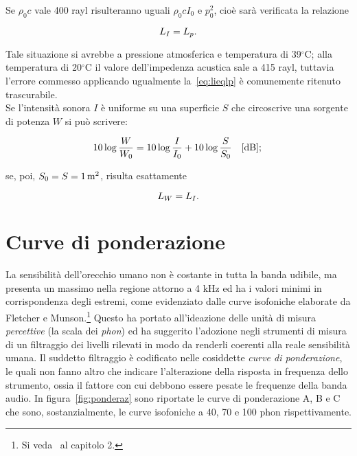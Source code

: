 Se $\rho_0 c$ vale 400 rayl risulteranno uguali $\rho_0 c I_0$ e $p_0^2$, cio\`e sar\`a verificata la
relazione 

\begin{equation}
  \label{eq:lieqlp}
  L_I = L_p.\\
\end{equation}

Tale situazione si avrebbe a pressione atmosferica e temperatura di 39$^\circ$C; alla temperatura di
20$^\circ$C il valore dell'impedenza acustica sale a 415 rayl, tuttavia l'errore commesso applicando
ugualmente la~\ref{eq:lieqlp} \`e comunemente ritenuto trascurabile.\\
Se l'intensit\`a sonora $I$ \`e uniforme su una superficie $S$ che circoscrive una sorgente di potenza
$W$ si pu\`o scrivere:

\begin{equation}
  \label{eq:lweqlieqls}
  10 \log \frac{W}{W_0} = 10 \log \frac{I}{I_0} + 10 \log \frac{S}{S_0} \quad \textrm{[dB]};\\
\end{equation}

se, poi, $S_0 = S = 1 \, \textrm{m}^2$, risulta esattamente 

\begin{equation}
  \label{eq:lweqli}
  L_W = L_I.\\
\end{equation}


\section{Curve di ponderazione}
\label{sec:pondcurves}

La sensibilit\`a dell'orecchio umano non \`e costante in tutta la banda udibile, ma presenta un massimo
nella regione attorno a 4 kHz ed ha i valori minimi in corrispondenza degli estremi, come evidenziato
dalle curve isofoniche elaborate da Fletcher e Munson.\footnote{ Si veda~\cite{mdaa} al capitolo 2.}
Questo ha portato all'ideazione delle unit\`a di misura \emph{percettive} (la scala dei \emph{phon})
ed ha suggerito l'adozione negli strumenti di misura di un filtraggio dei livelli rilevati in modo
da renderli coerenti alla reale sensibilit\`a umana. Il suddetto filtraggio \`e codificato nelle
cosiddette \emph{curve di ponderazione}, le quali non fanno altro che indicare l'alterazione della
risposta in frequenza dello strumento, ossia il fattore con cui debbono essere pesate le frequenze
della banda audio. In figura~\ref{fig:ponderaz} sono riportate le curve di ponderazione A, B e C
che sono, sostanzialmente, le curve isofoniche a 40, 70 e 100 phon rispettivamente.\\


